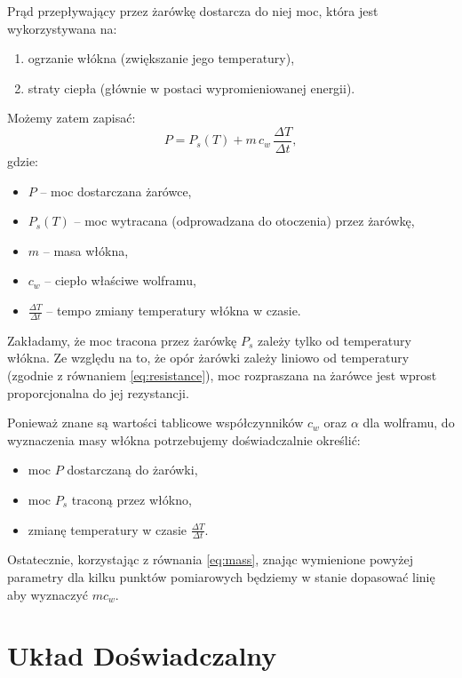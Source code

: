 \documentclass[12pt]{article}
\begin{document}
Prąd przepływający przez żarówkę dostarcza do niej moc, która jest wykorzystywana na:  
\begin{enumerate}
\item ogrzanie włókna (zwiększanie jego temperatury),  
\item straty ciepła (głównie w postaci wypromieniowanej energii).  
\end{enumerate}
Możemy zatem zapisać:
\begin{equation}
    P = P_s(T) + m\,c_w\,\frac{\Delta T}{\Delta t},
    \label{eq:mass}
\end{equation}
gdzie:  
\begin{itemize}
\item $P$ – moc dostarczana żarówce,  
\item $P_s(T)$ – moc wytracana (odprowadzana do otoczenia) przez żarówkę,  
\item $m$ – masa włókna,  
\item $c_w$ – ciepło właściwe wolframu,  
\item $\frac{\Delta T}{\Delta t}$ – tempo zmiany temperatury włókna w czasie.  
\end{itemize}

Zakładamy, że moc tracona przez żarówkę $P_s$ zależy tylko od temperatury włókna. Ze względu na to, że opór żarówki zależy liniowo od temperatury (zgodnie z równaniem \eqref{eq:resistance}), moc rozpraszana na żarówce jest wprost proporcjonalna do jej rezystancji.

Ponieważ znane są wartości tablicowe współczynników $c_w$ oraz $\alpha$ dla wolframu, do wyznaczenia masy włókna potrzebujemy doświadczalnie określić:  
\begin{itemize}
\item moc $P$ dostarczaną do żarówki,  
\item moc $P_s$ traconą przez włókno,  
\item zmianę temperatury w czasie $\frac{\Delta T}{\Delta t}$.  
\end{itemize}
Ostatecznie, korzystając z równania \eqref{eq:mass}, znając wymienione powyżej parametry dla kilku punktów pomiarowych będziemy w stanie dopasować linię aby wyznaczyć $mc_w$.

\section{Układ Doświadczalny}
\end{document}
